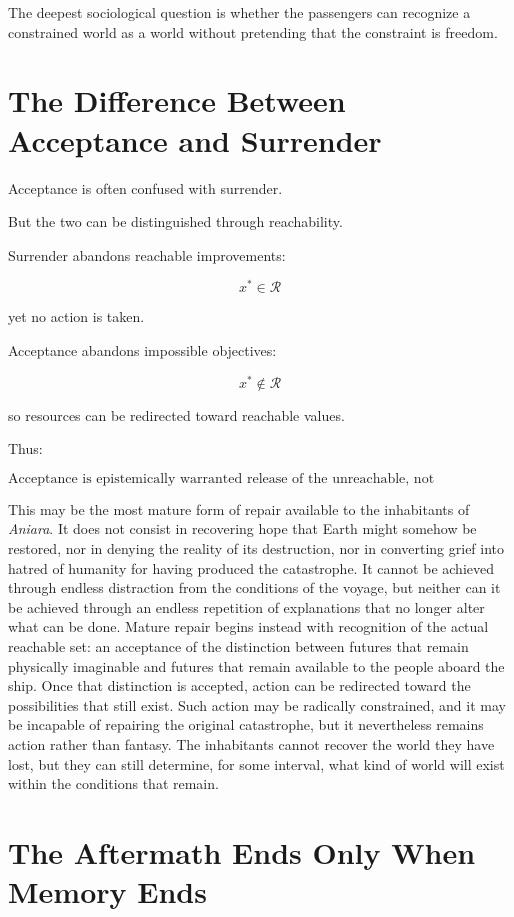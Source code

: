 \documentclass[11pt,oneside]{book}
\theoremstyle{definition}
\theoremstyle{remark}
\newcommand{\R}{\mathcal{R}}
\begin{document}
The deepest sociological question is whether the passengers can recognize a constrained world as a world without pretending that the constraint is freedom.

\section{The Difference Between Acceptance and Surrender}

Acceptance is often confused with surrender.

But the two can be distinguished through reachability.

Surrender abandons reachable improvements:

\[
x^\ast\in\R
\]

yet no action is taken.

Acceptance abandons impossible objectives:

\[
x^\ast\notin\R
\]

so resources can be redirected toward reachable values.

Thus:

\[
\boxed{
\text{Acceptance is epistemically warranted release of the unreachable, not abandonment of the reachable.}
}
\]

This may be the most mature form of repair available to the inhabitants of \emph{Aniara}. It does not consist in recovering hope that Earth might somehow be restored, nor in denying the reality of its destruction, nor in converting grief into hatred of humanity for having produced the catastrophe. It cannot be achieved through endless distraction from the conditions of the voyage, but neither can it be achieved through an endless repetition of explanations that no longer alter what can be done. Mature repair begins instead with recognition of the actual reachable set: an acceptance of the distinction between futures that remain physically imaginable and futures that remain available to the people aboard the ship. Once that distinction is accepted, action can be redirected toward the possibilities that still exist. Such action may be radically constrained, and it may be incapable of repairing the original catastrophe, but it nevertheless remains action rather than fantasy. The inhabitants cannot recover the world they have lost, but they can still determine, for some interval, what kind of world will exist within the conditions that remain.

\section{The Aftermath Ends Only When Memory Ends}
\end{document}
